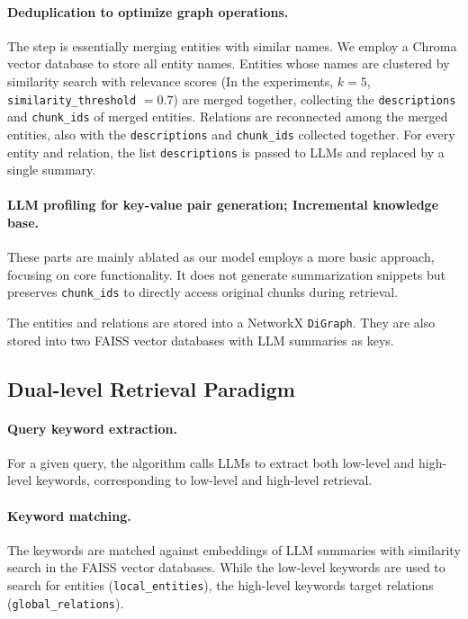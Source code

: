 \documentclass{article}
\begin{document}
    \paragraph{Deduplication to optimize graph operations.}
        The step is essentially merging entities with similar names.
        We employ a Chroma vector database to store all entity names.
        Entities whose names are clustered by similarity search with relevance scores 
        (In the experiments, $k=5$, \verb|similarity_threshold| $=0.7$)
        are merged together, collecting the \verb|descriptions| and \verb|chunk_ids| of merged entities.
        Relations are reconnected among the merged entities,
        also with the \verb|descriptions| and \verb|chunk_ids| collected together.
        For every entity and relation, the list \verb|descriptions| is passed to LLMs and replaced by a single summary.

    \paragraph{LLM profiling for key-value pair generation; Incremental knowledge base.}
        These parts are mainly ablated as our model employs a more basic approach, 
        focusing on core functionality.
        It does not generate summarization snippets but 
        preserves \verb|chunk_ids| to directly access original chunks during retrieval.
    
    The entities and relations are stored into a NetworkX \verb|DiGraph|.
    They are also stored into two FAISS vector databases with LLM summaries as keys.
        
  \subsection{Dual-level Retrieval Paradigm}

    \paragraph{Query keyword extraction.}
        For a given query, the algorithm calls LLMs to extract both low-level and high-level keywords,
        corresponding to low-level and high-level retrieval.

    \paragraph{Keyword matching.}
        The keywords are matched against embeddings of LLM summaries with similarity search in the FAISS vector databases.
        While the low-level keywords are used to search for entities (\verb|local_entities|),
        the high-level keywords target relations (\verb|global_relations|).
\end{document}
